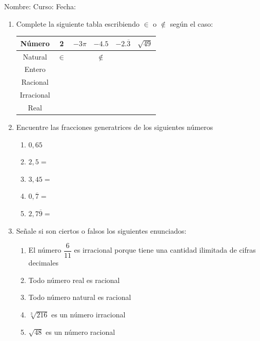 \documentclass[fleqn]{article}
\newcommand{\LineaNombre}{%
\par
\vspace{\baselineskip}
Nombre:\hrulefill \; Curso: \underline{\hspace*{36pt}} \; Fecha: \underline{\hspace*{2.5cm}} \relax
\par}
\begin{document}
\LineaNombre
\begin{enumerate}
   \item Complete la siguiente tabla escribiendo $\in$ o $\not\in$ según el caso:
\begin{center}
   \begin{tabular}{|c|c|c|c|c|c|}
\hline 
Número & 2 & $-3\pi$ & $-4.5$ & $-2.\overline{3}$ & $\sqrt{49}$ \\ 
\hline 
Natural & $\in$ &  & $\not\in$ &  &  \\ 
\hline 
Entero &  &  &  &  &  \\ 
\hline 
Racional &  &  &  &  &  \\ 
\hline 
Irracional &  &  &  &  &  \\ 
\hline 
Real &  &  &  &  &  \\ 
\hline 
\end{tabular} 
\end{center}
 \item Encuentre las fracciones generatrices de los siguientes números
\begin{enumerate}
\item $0,65$\noanswer
\item $2,5=$\noanswer
\item $3,45=$\noanswer
\item $0,\overline{7}=$\noanswer
\item $2,7\overline{9}=$\noanswer
\end{enumerate}
\item Señale si son ciertos o falsos los siguientes enunciados:
\begin{enumerate}
\item El número $\dfrac{6}{11}$ es irracional porque tiene una cantidad ilimitada de cifras decimales \underline{\hspace*{20pt}}
\item Todo número real es racional \underline{\hspace*{20pt}}
\newpage
\item Todo número natural es racional \underline{\hspace*{20pt}}
\item $\sqrt[3]{216}$ es un número irracional \underline{\hspace*{20pt}}
\item $\sqrt{48}$ es un número racional \underline{\hspace*{20pt}}

\end{enumerate}
\end{enumerate}
\end{document}
